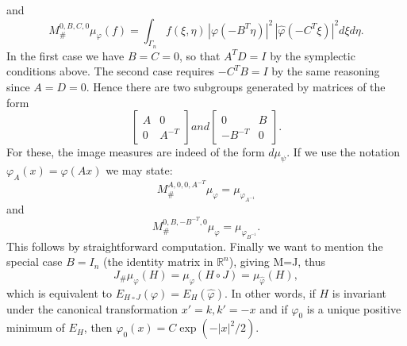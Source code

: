 \documentclass[12pt,a4paper,draft]{article}
\newcommand{\RR}[1]{\mathbb{R}^#1}
\begin{document}
and
\begin{displaymath}
       M^{0,B,C,0}_{\#}\mu_{\varphi}(f) =  \int_{\Gamma_n} f(\xi,\eta)\,
      |\varphi( - B^T \eta)|^2 \,
      |\hat\varphi(-C^T \xi)|^2 d\xi d\eta.
\end{displaymath}
In the first case we have $B=C=0$, so that $A^T D = I$ by the symplectic
conditions above. The second case requires $-C^T B=I$ by the same reasoning
since $A=D=0$. Hence there are two subgroups generated by matrices of the form
\begin{displaymath}
      \begin{bmatrix}
      A & 0 \\ 
      0 & A^{-T}
      \end{bmatrix}
and 
      \begin{bmatrix}
      0 & B \\ 
     -B^{-T} & 0
      \end{bmatrix}.        
\end{displaymath}
For these, the image measures are indeed of the form $d\mu_{\psi}$. If we use
the notation $\varphi_A(x)=\varphi(A x)$ we may state:
\begin{equation}
        M^{A,0,0,A^{-T}}_{\#}\mu_{\varphi} = \mu_{\varphi_{A^{-1}}}
\end{equation}
and
\begin{equation}
       M^{0,B,-B^{-T},0}_{\#}\mu_{\varphi} = \mu_{\widehat{\varphi_{B^{-1}}}}.
\end{equation}
This follows by straightforward computation. Finally we want to mention the 
special case $B=I_n$ (the identity matrix in $\RR n$), giving M=J, thus
\begin{displaymath}
        J_{\#}\mu_{\varphi}(H) = \mu_{\varphi}(H\circ J)=\mu_{\hat\varphi}(H),
\end{displaymath}
which is equivalent to $E_{H\circ J}(\varphi)=E_H({\hat\varphi})$. In other
words, if $H$ is invariant under the canonical transformation 
$x'=k, k'=-x$ and if $\varphi_0$ is a unique positive minimum of $E_H$, then 
$\varphi_0(x)=C \exp(-|x|^2/2)$.  
\end{document}
